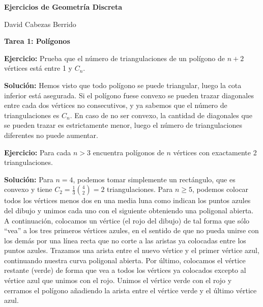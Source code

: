 \documentclass{amsart}
\begin{document}
\begin{center}
\textbf{\Large Ejercicios de Geometría Discreta}

\bigskip

David Cabezas Berrido

\end{center}

\begin{center}
	\textbf{\large Tarea 1: Polígonos}
\end{center}

\bigskip

\textbf{Ejercicio:} Prueba que el número de triangulaciones de un polígono de $n+2$ vértices está entre 1 y $C_n$.

\bigskip

\textbf{Soluci\'on:} Hemos visto que todo polígono se puede triangular, luego la cota inferior está asegurada. Si el polígono fuese convexo se pueden trazar diagonales entre cada dos vértices no consecutivos, y ya sabemos que el número de triangulaciones es $C_n$. En caso de no ser convexo, la cantidad de diagonales que se pueden trazar es estrictamente menor, luego el número de triangulaciones diferentes no puede aumentar.

\bigskip

\textbf{Ejercicio:} Para cada $n > 3$ encuentra polígonos de $n$ vértices con
exactamente 2 triangulaciones.

\bigskip

\textbf{Solución:} Para $n=4$, podemos tomar simplemente un rectángulo, que es convexo y tiene $C_2=\frac{1}{3}\binom{4}{2}=2$ triangulaciones. Para $n\geq 5$, podemos colocar todos los vértices menos dos en una media luna como indican los puntos azules del dibujo y unimos cada uno con el siguiente obteniendo una poligonal abierta. A continuación, colocamos un vértice (el rojo del dibujo) de tal forma que sólo ``vea'' a los tres primeros vértices azules, en el sentido de que no pueda unirse con los demás por una línea recta que no corte a las aristas ya colocadas entre los puntos azules. Trazamos una arista entre el nuevo vértice y el primer vértice azul, continuando nuestra curva poligonal abierta. Por último, colocamos el vértice restante (verde) de forma que vea a todos los vértices ya colocados excepto al vértice azul que unimos con el rojo. Unimos el vértice verde con el rojo y cerramos el polígono añadiendo la arista entre el vértice verde y el último vértice azul.
\end{document}

